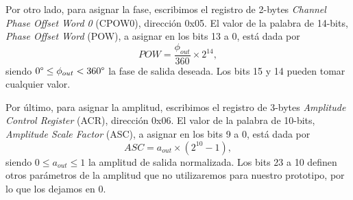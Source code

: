 \documentclass{article}
\newenvironment{standalone}{\begin{preview}}{\end{preview}}
\begin{document}
\begin{standalone}
  Por otro lado, para asignar la fase, escribimos el registro de 2-bytes \textit{Channel Phase Offset Word 0} (CPOW0), dirección 0x05.
  El valor de la palabra de 14-bits, \textit{Phase Offset Word} (POW), a asignar en los bits 13 a 0, está dada por
  \begin{equation}
    POW = \frac{\phi_{out}}{360} \times 2^{14},
  \end{equation}
  siendo $0\degree \leq \phi_{out} < 360\degree$ la fase de salida deseada.
  Los bits 15 y 14 pueden tomar cualquier valor.

  Por último, para asignar la amplitud, escribimos el registro de 3-bytes \textit{Amplitude Control Register} (ACR), dirección 0x06.
  El valor de la palabra de 10-bits, \textit{Amplitude Scale Factor} (ASC), a asignar en los bits 9 a 0, está dada por
  \begin{equation}
    ASC = a_{out} \times \left( 2^{10} - 1 \right),
  \end{equation}
  siendo $0 \leq a_{out} \leq 1$ la amplitud de salida normalizada.
  Los bits 23 a 10 definen otros parámetros de la amplitud que no utilizaremos para nuestro prototipo, por lo que los dejamos en 0.

\end{standalone}
\end{document}

